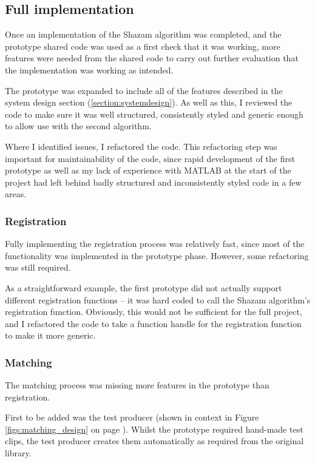 \documentclass[12pt,a4paper,twoside,openright]{report}
\begin{document}
\subsection{Full implementation}

Once an implementation of the Shazam algorithm was completed, and the prototype shared code was used as a first check that it was working, more features were needed from the shared code to carry out further evaluation that the implementation was working as intended.

The prototype was expanded to include all of the features described in the system design section (\ref{section:systemdesign}). As well as this, I reviewed the code to make sure it was well structured, consistently styled and generic enough to allow use with the second algorithm. 

Where I identified issues, I refactored the code. This refactoring step was important for maintainability of the code, since rapid development of the first prototype as well as my lack of experience with MATLAB at the start of the project had left behind badly structured and inconsistently styled code in a few areas.


\subsubsection{Registration}

Fully implementing the registration process was relatively fast, since most of the functionality was implemented in the prototype phase. However, some refactoring was still required.

As a straightforward example, the first prototype did not actually support different registration functions -- it was hard coded to call the Shazam algorithm's registration function. Obviously, this would not be sufficient for the full project, and I refactored the code to take a function handle for the registration function to make it more generic.

\subsubsection{Matching}

The matching process was missing more features in the prototype than registration.

First to be added was the test producer (shown in context in Figure \ref{figs:matching_design} on page \pageref{figs:matching_design}). Whilst the prototype required hand-made test clips, the test producer creates them automatically as required from the original library.
\end{document}
